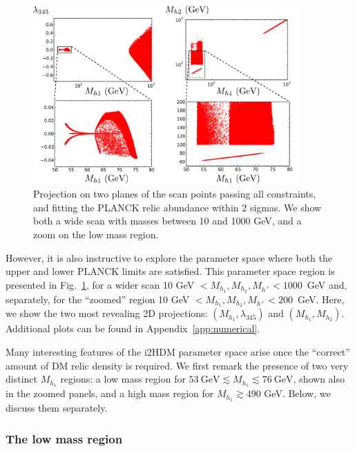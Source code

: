 \documentclass[12pt,a4paper]{article}
\begin{document}
\begin{figure}[htb]
\begin{center}
\includegraphics[width=0.9\textwidth]{Omega-monoc.pdf}
\caption{Projection on two planes of the scan points passing all constraints, and fitting the PLANCK relic abundance within 2 sigmas. We show both a wide scan with masses between 10 and 1000 GeV, and a zoom on the low mass region.  \label{fig:scan-simplified-fitting}} 
\end{center}
\end{figure}

However, it is also instructive to explore the parameter space where both
the upper and lower PLANCK limits are satisfied.
This parameter space region is presented in Fig.~\ref{fig:scan-simplified-fitting},
for a wider scan 10 GeV $< M_{h_1}, M_{h_2}, M_{h^{+}} < 1000$~GeV and, separately,
for the ``zoomed'' region 10 GeV $< M_{h_1}, M_{h_2}, M_{h^{+}} < 200$~GeV.
Here, we show the two most revealing 2D projections: $(M_{h_1},\lambda_{345})$ and $(M_{h_1},M_{h_2})$. 
Additional plots can be found in Appendix~\ref{app:numerical}.

Many interesting features of the i2HDM parameter space arise once the ``correct'' amount of DM relic density is required. 
We first remark the presence of two very distinct $M_{h_1}$ regions:  
a low mass region for $53~\mbox{GeV} \lesssim M_{h_1} \lesssim 76~\mbox{GeV}$, shown also in the zoomed panels,
and a high mass region for $M_{h_1}\gtrsim 490$ GeV. Below, we discuss them separately.

\subsubsection{The low mass region}
\end{document}
